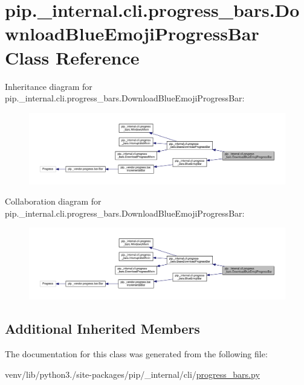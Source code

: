 \hypertarget{classpip_1_1__internal_1_1cli_1_1progress__bars_1_1DownloadBlueEmojiProgressBar}{}\section{pip.\+\_\+internal.\+cli.\+progress\+\_\+bars.\+Download\+Blue\+Emoji\+Progress\+Bar Class Reference}
\label{classpip_1_1__internal_1_1cli_1_1progress__bars_1_1DownloadBlueEmojiProgressBar}


Inheritance diagram for pip.\+\_\+internal.\+cli.\+progress\+\_\+bars.\+Download\+Blue\+Emoji\+Progress\+Bar\+:
\nopagebreak
\begin{figure}[H]
\begin{center}
\leavevmode
\includegraphics[width=350pt]{classpip_1_1__internal_1_1cli_1_1progress__bars_1_1DownloadBlueEmojiProgressBar__inherit__graph}
\end{center}
\end{figure}


Collaboration diagram for pip.\+\_\+internal.\+cli.\+progress\+\_\+bars.\+Download\+Blue\+Emoji\+Progress\+Bar\+:
\nopagebreak
\begin{figure}[H]
\begin{center}
\leavevmode
\includegraphics[width=350pt]{classpip_1_1__internal_1_1cli_1_1progress__bars_1_1DownloadBlueEmojiProgressBar__coll__graph}
\end{center}
\end{figure}
\subsection*{Additional Inherited Members}


The documentation for this class was generated from the following file\+:\begin{DoxyCompactItemize}
\item 
venv/lib/python3./site-\/packages/pip/\+\_\+internal/cli/\hyperlink{progress__bars_8py}{progress\+\_\+bars.\+py}\end{DoxyCompactItemize}
